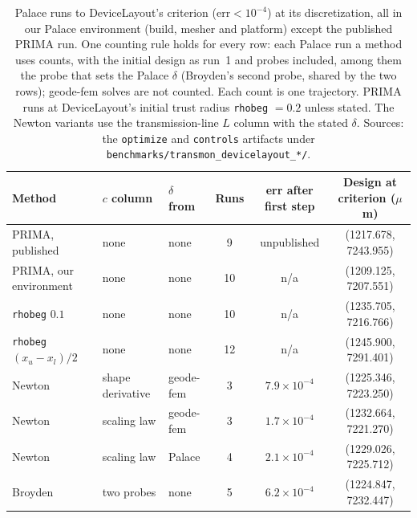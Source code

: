 \documentclass{anvil-paper}
\begin{document}
\begin{table}[htbp]
  \centering
  \caption{Palace runs to DeviceLayout's criterion ($\mathrm{err} <
  10^{-4}$) at its discretization, all in our Palace environment (build,
  mesher and platform) except the published PRIMA run. One counting rule
  holds for every row: each Palace run a method uses counts, with the
  initial design as run~1 and probes included, among them the probe that
  sets the Palace $\delta$ (Broyden's second probe, shared by the two rows);
  geode-fem solves are not counted. Each count is one trajectory. PRIMA
  runs at DeviceLayout's initial trust radius \texttt{rhobeg} $= 0.2$
  unless stated. The
  Newton variants use the transmission-line $L$ column with the stated
  $\delta$.
  Sources: the \texttt{optimize} and \texttt{controls} artifacts under
  \texttt{benchmarks/transmon\_devicelayout\_*/}.}
  \label{tab:controls}
  \footnotesize
  \begin{tabular}{@{}lllccc@{}}
    \toprule
    Method & $c$ column & $\delta$ from & Runs & err after first step & Design at criterion ($\mu$m) \\
    \midrule
    PRIMA, published & none & none & 9 & unpublished & (1217.678, 7243.955) \\
    PRIMA, our environment & none & none & 10 & n/a & (1209.125, 7207.551) \\
    \quad \texttt{rhobeg} $0.1$ & none & none & 10 & n/a & (1235.705, 7216.766) \\
    \quad \texttt{rhobeg} $(x_u - x_l)/2$ & none & none & 12 & n/a & (1245.900, 7291.401) \\
    Newton & shape derivative & geode-fem & 3 & $7.9\times10^{-4}$ & (1225.346, 7223.250) \\
    Newton & scaling law & geode-fem & 3 & $1.7\times10^{-4}$ & (1232.664, 7221.270) \\
    Newton & scaling law & Palace & 4 & $2.1\times10^{-4}$ & (1229.026, 7225.712) \\
    Broyden & two probes & none & 5 & $6.2\times10^{-4}$ & (1224.847, 7232.447) \\
    \bottomrule
  \end{tabular}
\end{table}
\end{document}

